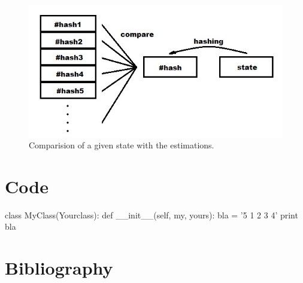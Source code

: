 \documentclass[a4paper,12pt]{book}
\begin{document}
\begin{figure}[!h]
\includegraphics{./Images/hashing.jpg}
	\centering
	\caption{Comparision of a given state with the estimations.}
	\label{fig:Capture1}
\end{figure}



	\chapter{Code}
	\begin{python}
		class MyClass(Yourclass):
		def __init__(self, my, yours):
		bla = '5 1 2 3 4'
		print bla
	\end{python}
	\chapter{Bibliography}

	
	\backmatter
	
\end{document}
